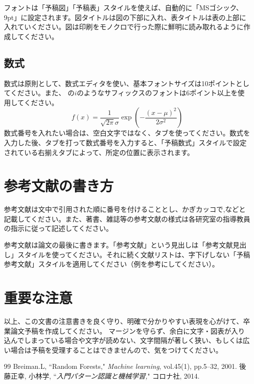 \documentclass[9pt,twocolumn]{jarticle}
\begin{document}
フォントは「予稿図」「予稿表」スタイルを使えば、自動的に「MSゴシック、9pt」に設定されます。図タイトルは図の下部に入れ、表タイトルは表の上部に入れていください。図は印刷をモノクロで行った際に鮮明に読み取れるように作成してください。
\subsection{数式}
数式は原則として、数式エディタを使い、基本フォントサイズは10ポイントとしてください。また、 の$i$のようなサフィックスのフォントは6ポイント以上を使用してください。
\begin{equation}
    f(x)=\frac{1}{\sqrt{2\pi}\sigma}\exp\left(
-\frac{(x - \mu)^2}{2\sigma^2}\right)
\end{equation}
数式番号を入れたい場合は、空白文字ではなく、タブを使ってください。数式を入力した後、タブを打って数式番号を入力すると、「予稿数式」スタイルで設定されている右揃えタブによって、所定の位置に表示されます。
\section{参考文献の書き方}
参考文献は文中で引用された順に番号を付けることとし、かぎカッコで\cite{B2001},\cite{GK2014}などと記載してください。また、著書、雑誌等の参考文献の様式は各研究室の指導教員の指示に従って記述してください。

参考文献は論文の最後に書きます。「参考文献」という見出しは「参考文献見出し」スタイルを使ってください。それに続く文献リストは、字下げしない「予稿参考文献」スタイルを適用してください（例を参考にしてください）。
\section{重要な注意}
以上、この文書の注意書きを良く守り、明確で分かりやすい表現を心がけて、卒業論文予稿を作成してください。
マージンを守らず、余白に文字・図表が入り込んでしまっている場合や文字が読めない、文字間隔が著しく狭い、もしくは広い場合は予稿を受理することはできませんので、気をつけてください。

\begin{thebibliography}{99} 
Breiman.L, ``Random Forests," {\it Machine learning}, vol.45(1), pp.5--32, 2001.
後藤正幸, 小林学, ``{\it 入門パターン認識と機械学習,}" コロナ社, 2014.


\end{thebibliography}
\end{document}
